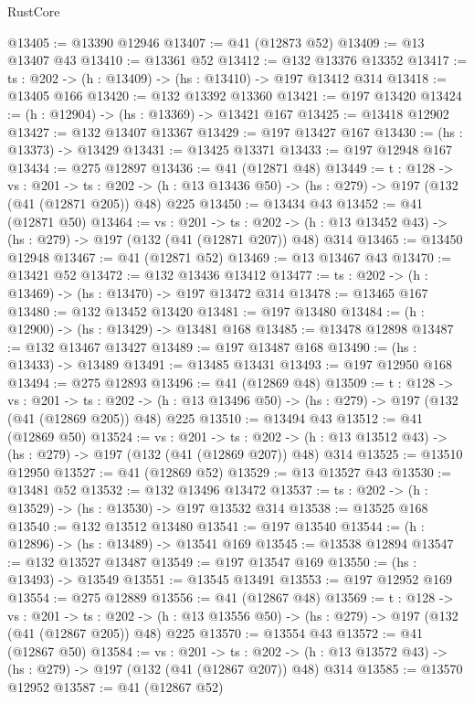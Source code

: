 \begin{lexlean}{RustCore}
\begin{coremodule}
@13405 := @13390 @12946
@13407 := @41 (@12873 @52)
@13409 := @13 @13407 @43
@13410 := @13361 @52
@13412 := @132 @13376 @13352
@13417 := {ts : @202} -> (h : @13409) -> (hs : @13410) -> @197 @13412 @314
@13418 := @13405 @166
@13420 := @132 @13392 @13360
@13421 := @197 @13420
@13424 := (h : @12904) -> (hs : @13369) -> @13421 @167
@13425 := @13418 @12902
@13427 := @132 @13407 @13367
@13429 := @197 @13427 @167
@13430 := (hs : @13373) -> @13429
@13431 := @13425 @13371
@13433 := @197 @12948 @167
@13434 := @275 @12897
@13436 := @41 (@12871 @48)
@13449 := {t : @128} ->
  {vs : @201} ->
  {ts : @202} -> (h : @13 @13436 @50) -> (hs : @279) -> @197 (@132 (@41 (@12871 @205)) @48) @225
@13450 := @13434 @43
@13452 := @41 (@12871 @50)
@13464 := {vs : @201} ->
  {ts : @202} -> (h : @13 @13452 @43) -> (hs : @279) -> @197 (@132 (@41 (@12871 @207)) @48) @314
@13465 := @13450 @12948
@13467 := @41 (@12871 @52)
@13469 := @13 @13467 @43
@13470 := @13421 @52
@13472 := @132 @13436 @13412
@13477 := {ts : @202} -> (h : @13469) -> (hs : @13470) -> @197 @13472 @314
@13478 := @13465 @167
@13480 := @132 @13452 @13420
@13481 := @197 @13480
@13484 := (h : @12900) -> (hs : @13429) -> @13481 @168
@13485 := @13478 @12898
@13487 := @132 @13467 @13427
@13489 := @197 @13487 @168
@13490 := (hs : @13433) -> @13489
@13491 := @13485 @13431
@13493 := @197 @12950 @168
@13494 := @275 @12893
@13496 := @41 (@12869 @48)
@13509 := {t : @128} ->
  {vs : @201} ->
  {ts : @202} -> (h : @13 @13496 @50) -> (hs : @279) -> @197 (@132 (@41 (@12869 @205)) @48) @225
@13510 := @13494 @43
@13512 := @41 (@12869 @50)
@13524 := {vs : @201} ->
  {ts : @202} -> (h : @13 @13512 @43) -> (hs : @279) -> @197 (@132 (@41 (@12869 @207)) @48) @314
@13525 := @13510 @12950
@13527 := @41 (@12869 @52)
@13529 := @13 @13527 @43
@13530 := @13481 @52
@13532 := @132 @13496 @13472
@13537 := {ts : @202} -> (h : @13529) -> (hs : @13530) -> @197 @13532 @314
@13538 := @13525 @168
@13540 := @132 @13512 @13480
@13541 := @197 @13540
@13544 := (h : @12896) -> (hs : @13489) -> @13541 @169
@13545 := @13538 @12894
@13547 := @132 @13527 @13487
@13549 := @197 @13547 @169
@13550 := (hs : @13493) -> @13549
@13551 := @13545 @13491
@13553 := @197 @12952 @169
@13554 := @275 @12889
@13556 := @41 (@12867 @48)
@13569 := {t : @128} ->
  {vs : @201} ->
  {ts : @202} -> (h : @13 @13556 @50) -> (hs : @279) -> @197 (@132 (@41 (@12867 @205)) @48) @225
@13570 := @13554 @43
@13572 := @41 (@12867 @50)
@13584 := {vs : @201} ->
  {ts : @202} -> (h : @13 @13572 @43) -> (hs : @279) -> @197 (@132 (@41 (@12867 @207)) @48) @314
@13585 := @13570 @12952
@13587 := @41 (@12867 @52)

\end{coremodule}
\end{lexlean}
